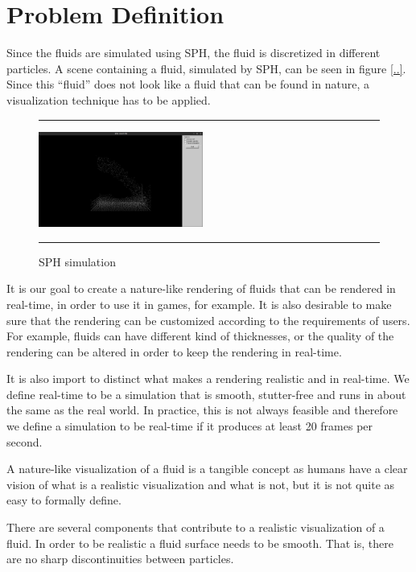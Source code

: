 \section{Problem Definition}
Since the fluids are simulated using SPH, the fluid is discretized in different particles.
A scene containing a fluid, simulated by SPH, can be seen in figure \ref{..}.
Since this ``fluid'' does not look like a fluid that can be found in nature, a visualization technique has to be applied.

\begin{figure}[!th]
\hrule
\begin{center}
\vspace*{2ex}\includegraphics[width=0.48\textwidth]{pictures/sph.png}
\end{center}
\caption{SPH simulation}
\label{fig:sph} 
\vspace*{2ex}
\hrule
\end{figure}

It is our goal to create a nature-like rendering of fluids that can be rendered in real-time, in order to use it in games, for example.
It is also desirable to make sure that the rendering can be customized according to the requirements of users.
For example, fluids can have different kind of thicknesses, or the quality of the rendering can be altered in order to keep the rendering in real-time.

It is also import to distinct what makes a rendering realistic and in real-time. 
We define real-time to be a simulation that is smooth, stutter-free and runs in about the same as the real world.
In practice, this is not always feasible and therefore we define a simulation to be real-time if it produces at least 20 frames per second.

A nature-like visualization of a fluid is a tangible concept as humans have a clear vision of what is a realistic visualization and what is not, but it is not quite as easy to formally define.

There are several components that contribute to a realistic visualization of a fluid.
In order to be realistic a fluid surface needs to be smooth. That is, there are no sharp discontinuities between particles.

